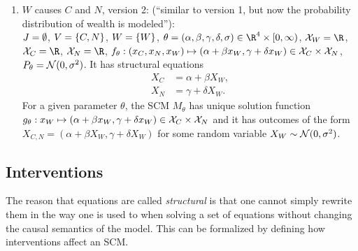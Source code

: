\begin{Eg}
\begin{enumerate}
\begin{align*}
        X_C^{\doit(x_W)} & = \alpha + \beta x_W, \\
        X_N^{\doit(x_W)} & = \gamma + \delta x_W.
      \end{align*}
      For a given parameter $\theta$, the SCM $M_{\theta}$ has 
      unique solution function $g_\theta : x_W \mapsto (\alpha + \beta x_W, \gamma + \delta x_W) \in \C{X}_C \times \C{X}_N$
      and it has unique potential outcomes of the form $X_{C,N}^{\doit(x_W)} = (\alpha + \beta x_W, \gamma + \delta x_W)$.
    \item $W$ causes $C$ and $N$, version 2: (``similar to version 1, but now the probability distribution of wealth is modeled''):\\
      $J = \emptyset$, $V = \{C,N\}$, $W = \{W\}$, $\theta = (\alpha,\beta,\gamma,\delta,\sigma) \in \RN^4 \times [0,\infty)$, 
      $\C{X}_W = \RN$, $\C{X}_C = \RN$, $\C{X}_N = \RN$, $f_{\theta} : (x_C,x_N,x_W) \mapsto (\alpha + \beta x_W, \gamma + \delta x_W) \in \mathcal{X}_C \times \mathcal{X}_N$, $P_{\theta} = \mathcal{N}(0,\sigma^2)$.
      It has structural  equations
      \begin{align*}
        X_C & = \alpha + \beta X_W, \\
        X_N & = \gamma + \delta X_W.
      \end{align*}
      For a given parameter $\theta$, the SCM $M_{\theta}$ has 
      unique solution function $g_\theta : x_W \mapsto (\alpha + \beta x_W, \gamma + \delta x_W) \in \C{X}_C \times \C{X}_N$ and
      it has outcomes of the form $X_{C,N} = (\alpha + \beta X_W, \gamma + \delta X_W)$ for some random variable $X_W \sim \mathcal{N}(0,\sigma^2)$.
  \end{enumerate}
\end{Eg}

\subsection{Interventions}

The reason that equations  are called \emph{structural} is that one cannot simply rewrite them in the way one is used to when solving a set of equations without changing the causal semantics of the model.
This can be formalized by defining how interventions affect an SCM.

